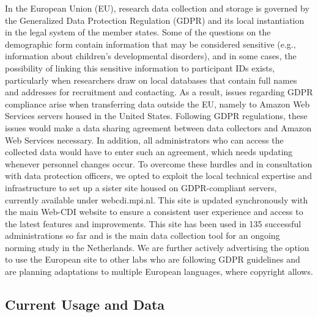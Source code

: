 \documentclass[
  english,
  man]{apa7}
\begin{document}
In the European Union (EU), research data collection and storage is governed by the Generalized Data Protection Regulation (GDPR) and its local instantiation in the legal system of the member states. Some of the questions on the demographic form contain information that may be considered sensitive (e.g., information about children's developmental disorders), and in some cases, the possibility of linking this sensitive information to participant IDs exists, particularly when researchers draw on local databases that contain full names and addresses for recruitment and contacting. As a result, issues regarding GDPR compliance arise when transferring data outside the EU, namely to Amazon Web Services servers housed in the United States. Following GDPR regulations, these issues would make a data sharing agreement between data collectors and Amazon Web Services necessary. In addition, all administrators who can access the collected data would have to enter such an agreement, which needs updating whenever personnel changes occur. To overcome these hurdles and in consultation with data protection officers, we opted to exploit the local technical expertise and infrastructure to set up a sister site housed on GDPR-compliant servers, currently available under webcdi.mpi.nl. This site is updated synchronously with the main Web-CDI website to ensure a consistent user experience and access to the latest features and improvements. This site has been used in 135 successful administrations so far and is the main data collection tool for an ongoing norming study in the Netherlands. We are further actively advertising the option to use the European site to other labs who are following GDPR guidelines and are planning adaptations to multiple European languages, where copyright allows.

\hypertarget{current-usage-and-data}{%
\subsection{Current Usage and Data}\label{current-usage-and-data}}
\end{document}
